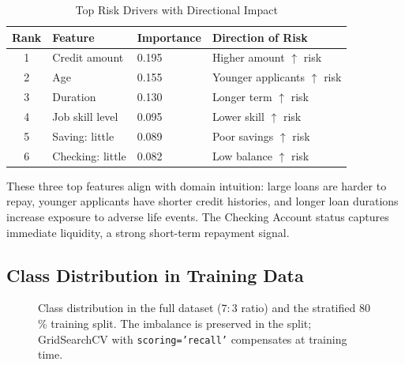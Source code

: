 \documentclass[12pt,a4paper]{article}
\theoremstyle{definition}
\begin{document}
\begin{table}[H]
  \centering
  \caption{Top Risk Drivers with Directional Impact}
  \label{tab:drivers}
  \begin{tabular}{clll}
    \toprule
    \textbf{Rank} & \textbf{Feature} & \textbf{Importance} & \textbf{Direction of Risk} \\
    \midrule
    1 & Credit amount      & 0.195 & Higher amount $\uparrow$ risk \\
    2 & Age                & 0.155 & Younger applicants $\uparrow$ risk \\
    3 & Duration           & 0.130 & Longer term $\uparrow$ risk \\
    4 & Job skill level    & 0.095 & Lower skill $\uparrow$ risk \\
    5 & Saving: little     & 0.089 & Poor savings $\uparrow$ risk \\
    6 & Checking: little   & 0.082 & Low balance $\uparrow$ risk \\
    \bottomrule
  \end{tabular}
\end{table}

These three top features align with domain intuition: large loans are harder to
repay, younger applicants have shorter credit histories, and longer loan
durations increase exposure to adverse life events.  The Checking Account
status captures immediate liquidity, a strong short-term repayment signal.

\subsection{Class Distribution in Training Data}

\begin{figure}[H]
\centering
{}
\caption{Class distribution in the full dataset ($7{:}3$ ratio) and the
  stratified 80\,\% training split.  The imbalance is preserved in the split;
  GridSearchCV with \texttt{scoring='recall'} compensates at training time.}
\label{fig:smote-bar}
\end{figure}
\end{document}
